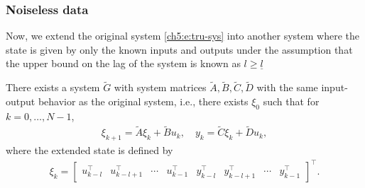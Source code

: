 \subsubsection{Noiseless data}
\label{sec:output}
%
Now, we extend the original system \eqref{ch5:e:tru-sys} into another system where the state is given by only the known inputs and outputs under the assumption that the upper bound on the lag of the system is known as $l \geq \underline{l}$
\begin{lemma}[\cite{9551767}]
\label{lem:extended}
There exists a system $\widetilde{G}$ with system matrices $\widetilde{A},\widetilde{B},\widetilde{C},\widetilde{D}$ with the same input-output behavior as the original system, i.e., there exists $\xi_0$ such that for $k=0,\dots,N-1$,
\begin{align}\label{eq:sys_stacked}
\xi_{k+1} = \widetilde{A} \xi_k + \widetilde{B} u_k, \quad
y_k = \widetilde{C} \xi_k + \widetilde{D} u_k,
\end{align}
where the extended state is defined by
\begin{align*}
{
\xi_{k} = \begin{bmatrix} u_{k-l}^\top & u_{k-l+1}^\top & \cdots & u_{k-1}^\top & y_{k-l}^\top & y_{k-l+1}^\top & \cdots & y_{k-1}^\top \end{bmatrix}^\top.}
\end{align*} 
\end{lemma}
